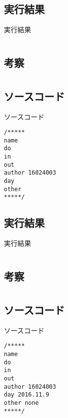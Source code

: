 \documentclass[a4j,titlepage]{jarticle}
\begin{document}
\subsection{実行結果}
\begin{itembox}[l]{実行結果}
\begin{verbatim}

\end{verbatim}
\end{itembox}

\subsection{考察}


\section{}
\subsection{ソースコード}
\begin{itembox}[l]{ソースコード}
\begin{verbatim}
/*****
name 
do 
in 
out 
author 16024003
day 
other 
*****/

\end{verbatim}
\end{itembox}

\subsection{実行結果}
\begin{itembox}[l]{実行結果}
\begin{verbatim}

\end{verbatim}
\end{itembox}

\subsection{考察}


\section{}
\subsection{ソースコード}
\begin{itembox}[l]{ソースコード}
\begin{verbatim}
/*****
name 
do 
in 
out 
author 16024003
day 2016.11.9
other none 
*****/

\end{verbatim}
\end{itembox}
\end{document}
